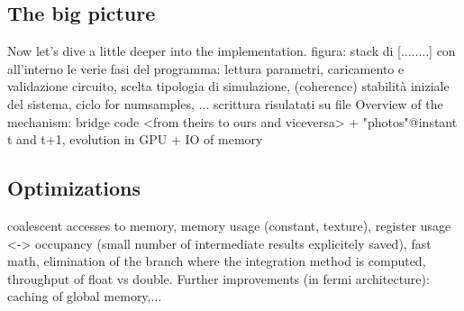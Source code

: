 \subsection{The big picture}
Now let's dive a little deeper into the implementation.
figura: stack di [........] con all'interno le verie fasi del programma: lettura parametri, caricamento e validazione circuito, scelta tipologia di simulazione, (coherence) stabilità iniziale del sistema, ciclo for numsamples, ... scrittura risulatati su file
Overview of the mechanism: bridge code <from theirs to ours and viceversa> + "photos"@instant t and t+1, evolution in GPU + IO of memory
\subsection{Optimizations}
coalescent accesses to memory, memory usage (constant, texture), register usage <-> occupancy (small number of intermediate results explicitely saved), fast math, elimination of the branch where the integration method is computed, throughput of float vs double. Further improvements (in fermi architecture): caching of global memory,...
